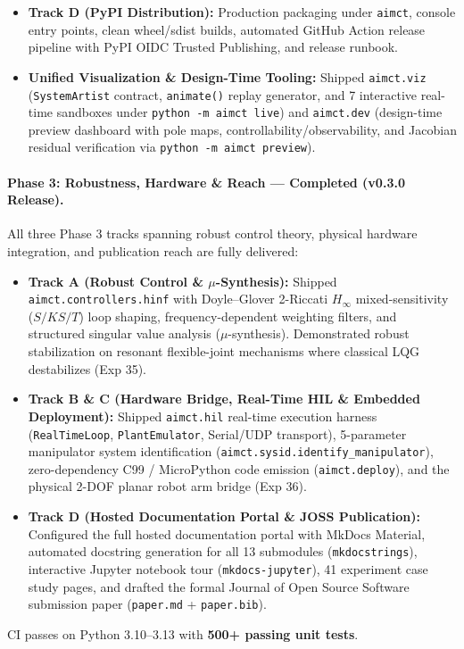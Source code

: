 \documentclass[11pt,a4paper]{article}
\begin{document}
\begin{itemize}[nosep]
  \item \textbf{Track D (PyPI Distribution):} Production packaging under \texttt{aimct}, console entry points, clean wheel/sdist builds, automated GitHub Action release pipeline with PyPI OIDC Trusted Publishing, and release runbook.
  \item \textbf{Unified Visualization \& Design-Time Tooling:} Shipped \texttt{aimct.viz} (\texttt{SystemArtist} contract, \texttt{animate()} replay generator, and 7 interactive real-time sandboxes under \texttt{python -m aimct live}) and \texttt{aimct.dev} (design-time preview dashboard with pole maps, controllability/observability, and Jacobian residual verification via \texttt{python -m aimct preview}).
\end{itemize}

\paragraph{Phase 3: Robustness, Hardware \& Reach --- Completed (v0.3.0 Release).}
All three Phase 3 tracks spanning robust control theory, physical hardware integration, and publication reach are fully delivered:
\begin{itemize}[nosep]
  \item \textbf{Track A (Robust Control \& $\mu$-Synthesis):} Shipped \texttt{aimct.controllers.hinf} with Doyle--Glover 2-Riccati $H_\infty$ mixed-sensitivity ($S/KS/T$) loop shaping, frequency-dependent weighting filters, and structured singular value analysis ($\mu$-synthesis). Demonstrated robust stabilization on resonant flexible-joint mechanisms where classical LQG destabilizes (Exp 35).
  \item \textbf{Track B \& C (Hardware Bridge, Real-Time HIL \& Embedded Deployment):} Shipped \texttt{aimct.hil} real-time execution harness (\texttt{RealTimeLoop}, \texttt{PlantEmulator}, Serial/UDP transport), 5-parameter manipulator system identification (\texttt{aimct.sysid.identify\_manipulator}), zero-dependency C99 / MicroPython code emission (\texttt{aimct.deploy}), and the physical 2-DOF planar robot arm bridge (Exp 36).
  \item \textbf{Track D (Hosted Documentation Portal \& JOSS Publication):} Configured the full hosted documentation portal with MkDocs Material, automated docstring generation for all 13 submodules (\texttt{mkdocstrings}), interactive Jupyter notebook tour (\texttt{mkdocs-jupyter}), 41 experiment case study pages, and drafted the formal Journal of Open Source Software submission paper (\texttt{paper.md} + \texttt{paper.bib}).
\end{itemize}
CI passes on Python 3.10--3.13 with \textbf{500+ passing unit tests}.
\end{document}
